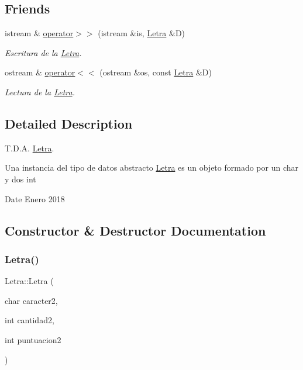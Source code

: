 \subsection*{Friends}
\begin{DoxyCompactItemize}
\item 
istream \& \mbox{\hyperlink{classLetra_a2cfa9253e58d293cbbeeb108640809d8}{operator$>$$>$}} (istream \&is, \mbox{\hyperlink{classLetra}{Letra}} \&D)
\begin{DoxyCompactList}\small\item\em Escritura de la \mbox{\hyperlink{classLetra}{Letra}}. \end{DoxyCompactList}\item 
ostream \& \mbox{\hyperlink{classLetra_a09586a0209ffbd18eb8c0064ab38f314}{operator$<$$<$}} (ostream \&os, const \mbox{\hyperlink{classLetra}{Letra}} \&D)
\begin{DoxyCompactList}\small\item\em Lectura de la \mbox{\hyperlink{classLetra}{Letra}}. \end{DoxyCompactList}\end{DoxyCompactItemize}


\subsection{Detailed Description}
T.\+D.\+A. \mbox{\hyperlink{classLetra}{Letra}}. 

Una instancia del tipo de datos abstracto {\ttfamily \mbox{\hyperlink{classLetra}{Letra}}} es un objeto formado por un char y dos int

\begin{DoxyDate}{Date}
Enero 2018 
\end{DoxyDate}


\subsection{Constructor \& Destructor Documentation}
\mbox{\label{classLetra_a454348d5e8b5c9f8d8139f16b1ba6ee8}} 
\subsubsection{\texorpdfstring{Letra()}{Letra()}}
{\footnotesize\ttfamily Letra\+::\+Letra (\begin{DoxyParamCaption}\item[{char}]{caracter2,  }\item[{int}]{cantidad2,  }\item[{int}]{puntuacion2 }\end{DoxyParamCaption})}



